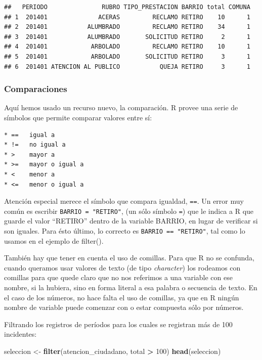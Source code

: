 \documentclass[spanish,]{book}
\newenvironment{Shaded}{\begin{snugshade}}{\end{snugshade}}
\newcommand{\DecValTok}[1]{\textcolor[rgb]{0.00,0.00,0.81}{#1}}
\newcommand{\KeywordTok}[1]{\textcolor[rgb]{0.13,0.29,0.53}{\textbf{#1}}}
\newcommand{\NormalTok}[1]{#1}
\newcommand{\OperatorTok}[1]{\textcolor[rgb]{0.81,0.36,0.00}{\textbf{#1}}}
\newcommand{\StringTok}[1]{\textcolor[rgb]{0.31,0.60,0.02}{#1}}
\begin{document}
\begin{verbatim}
##   PERIODO               RUBRO TIPO_PRESTACION BARRIO total COMUNA
## 1  201401              ACERAS         RECLAMO RETIRO    10      1
## 2  201401           ALUMBRADO         RECLAMO RETIRO    34      1
## 3  201401           ALUMBRADO       SOLICITUD RETIRO     2      1
## 4  201401            ARBOLADO         RECLAMO RETIRO    10      1
## 5  201401            ARBOLADO       SOLICITUD RETIRO     3      1
## 6  201401 ATENCION AL PUBLICO           QUEJA RETIRO     3      1
\end{verbatim}

\hypertarget{comparaciones}{%
\subsubsection{Comparaciones}\label{comparaciones}}

Aquí hemos usado un recurso nuevo, la comparación. R provee una serie de símbolos que permite comparar valores entre sí:

\begin{verbatim}
* ==   igual a 
* !=   no igual a 
* >    mayor a 
* >=   mayor o igual a 
* <    menor a 
* <=   menor o igual a 
\end{verbatim}

Atención especial merece el símbolo que compara igualdad, \texttt{==}. Un error muy común es escribir \texttt{BARRIO\ =\ "RETIRO"}, (un sólo símbolo \texttt{=}) que le indica a R que guarde el valor ``RETIRO'' dentro de la variable BARRIO, en lugar de verificar si son iguales. Para ésto último, lo correcto es \texttt{BARRIO\ ==\ "RETIRO"}, tal como lo usamos en el ejemplo de filter().

También hay que tener en cuenta el uso de comillas. Para que R no se confunda, cuando queramos usar valores de texto (de tipo \emph{character}) los rodeamos con comillas para que quede claro que no nos referimos a una variable con ese nombre, si la hubiera, sino en forma literal a esa palabra o secuencia de texto. En el caso de los números, no hace falta el uso de comillas, ya que en R ningún nombre de variable puede comenzar con o estar compuesta sólo por números.

Filtrando los registros de períodos para los cuales se registran más de 100 incidentes:

\begin{Shaded}
\begin{Highlighting}[]
\NormalTok{seleccion <-}\StringTok{ }\KeywordTok{filter}\NormalTok{(atencion_ciudadano, total }\OperatorTok{>}\StringTok{ }\DecValTok{100}\NormalTok{)}
\KeywordTok{head}\NormalTok{(seleccion)}
\end{Highlighting}
\end{Shaded}
\end{document}
